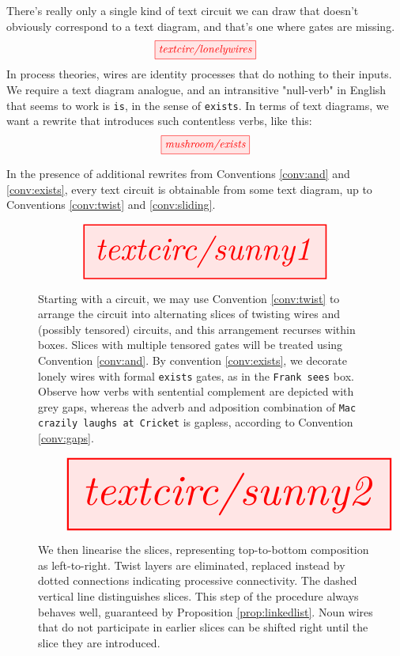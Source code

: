 \begin{convention}\label{conv:exists}
There's really only a single kind of text circuit we can draw that doesn't obviously correspond to a text diagram, and that's one where gates are missing.
\[
\tikzfig{textcirc/lonelywires} 
\]
In process theories, wires are identity processes that do nothing to their inputs. We require a text diagram analogue, and an intransitive "null-verb" in English that seems to work is \texttt{is}, in the sense of \texttt{exists}. In terms of text diagrams, we want a rewrite that introduces such contentless verbs, like this:
\[
\tikzfig{mushroom/exists} 
\]
\end{convention}

\begin{construction}\label{prop:circ2text}
In the presence of additional rewrites from Conventions \ref{conv:and} and \ref{conv:exists}, every text circuit is obtainable from some text diagram, up to Conventions \ref{conv:twist} and \ref{conv:sliding}.

\begin{figure}[h!]
\centering
\[
\resizebox{0.75\textwidth}{!}{\tikzfig{textcirc/sunny1}}
\]
\caption{Starting with a circuit, we may use Convention \ref{conv:twist} to arrange the circuit into alternating slices of twisting wires and (possibly tensored) circuits, and this arrangement recurses within boxes. Slices with multiple tensored gates will be treated using Convention \ref{conv:and}. By convention \ref{conv:exists}, we decorate lonely wires with formal \texttt{exists} gates, as in the \texttt{Frank sees} box. Observe how verbs with sentential complement are depicted with grey gaps, whereas the adverb and adposition combination of \texttt{Mac crazily laughs at Cricket} is gapless, according to Convention \ref{conv:gaps}.}
\end{figure}

\begin{figure}[h!]
\centering
\[
\resizebox{\textwidth}{!}{\tikzfig{textcirc/sunny2}}
\]
\caption{We then linearise the slices, representing top-to-bottom composition as left-to-right. Twist layers are eliminated, replaced instead by dotted connections indicating processive connectivity. The dashed vertical line distinguishes slices. This step of the procedure always behaves well, guaranteed by Proposition \ref{prop:linkedlist}. Noun wires that do not participate in earlier slices can be shifted right until the slice they are introduced.}
\end{figure}


\end{construction}
